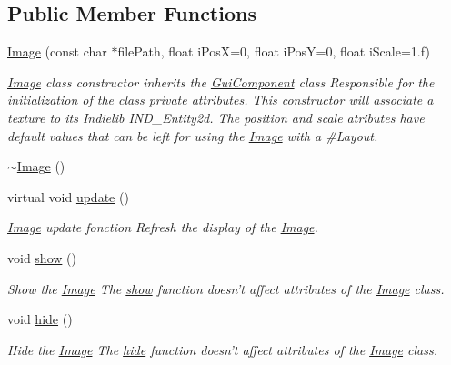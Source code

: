 \subsection*{Public Member Functions}
\begin{DoxyCompactItemize}
\item 
\hyperlink{class_symp_1_1_image_afc591fe2f9770e6139509c4c62ffd3c1}{Image} (const char $\ast$file\-Path, float i\-Pos\-X=0, float i\-Pos\-Y=0, float i\-Scale=1.f)
\begin{DoxyCompactList}\small\item\em \hyperlink{class_symp_1_1_image}{Image} class constructor inherits the \hyperlink{class_symp_1_1_gui_component}{Gui\-Component} class Responsible for the initialization of the class private attributes. This constructor will associate a texture to its Indielib I\-N\-D\-\_\-\-Entity2d. The position and scale atributes have default values that can be left for using the \hyperlink{class_symp_1_1_image_afc591fe2f9770e6139509c4c62ffd3c1}{Image} with a \#\-Layout. \end{DoxyCompactList}\item 
\hyperlink{class_symp_1_1_image_a14ac6d979d7c3aed090183e64d42da1d}{$\sim$\-Image} ()
\item 
virtual void \hyperlink{class_symp_1_1_image_a8de69cca37efc613094cfd1311ea1e13}{update} ()
\begin{DoxyCompactList}\small\item\em \hyperlink{class_symp_1_1_image}{Image} update fonction Refresh the display of the \hyperlink{class_symp_1_1_image_afc591fe2f9770e6139509c4c62ffd3c1}{Image}. \end{DoxyCompactList}\item 
void \hyperlink{class_symp_1_1_image_a8546f7d9cb33ce27ecaf13fe18f838ea}{show} ()
\begin{DoxyCompactList}\small\item\em Show the \hyperlink{class_symp_1_1_image}{Image} The \hyperlink{class_symp_1_1_image_a8546f7d9cb33ce27ecaf13fe18f838ea}{show} function doesn't affect attributes of the \hyperlink{class_symp_1_1_image_afc591fe2f9770e6139509c4c62ffd3c1}{Image} class. \end{DoxyCompactList}\item 
void \hyperlink{class_symp_1_1_image_aee4aa4257ba4c4b9d6c7547e2740399e}{hide} ()
\begin{DoxyCompactList}\small\item\em Hide the \hyperlink{class_symp_1_1_image}{Image} The \hyperlink{class_symp_1_1_image_aee4aa4257ba4c4b9d6c7547e2740399e}{hide} function doesn't affect attributes of the \hyperlink{class_symp_1_1_image_afc591fe2f9770e6139509c4c62ffd3c1}{Image} class. \end{DoxyCompactList}\item 

\end{DoxyCompactItemize}
